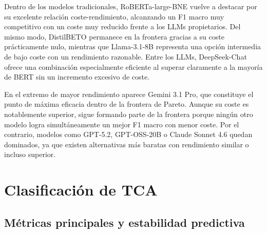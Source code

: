 Dentro de los modelos tradicionales, RoBERTa-large-BNE vuelve a destacar por su excelente relación coste-rendimiento, alcanzando un F1 macro muy competitivo con un coste muy reducido frente a los LLMs propietarios. Del mismo modo, DistilBETO permanece en la frontera gracias a su coste prácticamente nulo, mientras que Llama-3.1-8B representa una opción intermedia de bajo coste con un rendimiento razonable. Entre los LLMs, DeepSeek-Chat ofrece una combinación especialmente eficiente al superar claramente a la mayoría de BERT sin un incremento excesivo de coste.

En el extremo de mayor rendimiento aparece Gemini 3.1 Pro, que constituye el punto de máxima eficacia dentro de la frontera de Pareto. Aunque su coste es notablemente superior, sigue formando parte de la frontera porque ningún otro modelo logra simultáneamente un mejor F1 macro con menor coste. Por el contrario, modelos como GPT-5.2, GPT-OSS-20B o Claude Sonnet 4.6 quedan dominados, ya que existen alternativas más baratas con rendimiento similar o incluso superior.


\section{Clasificación de TCA}

\subsection{Métricas principales y estabilidad predictiva}

